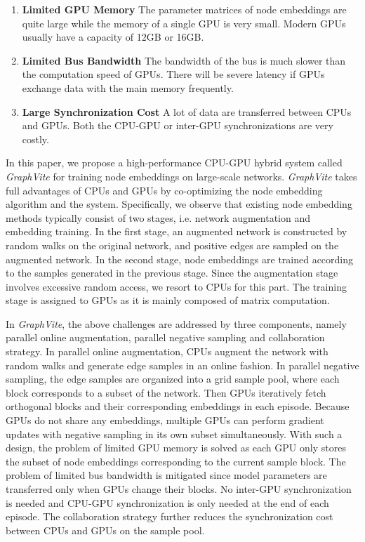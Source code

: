 \documentclass[sigconf]{acmart}
\newcommand{\Graphy}{\textit{GraphVite}\xspace}
\begin{document}
\begin{enumerate}[leftmargin=*]
    \item{\textbf{Limited GPU Memory} The parameter matrices of node embeddings are quite large while the memory of a single GPU is very small. Modern GPUs usually have a capacity of 12GB or 16GB. }
    \item{\textbf{Limited Bus Bandwidth} The bandwidth of the bus is much slower than the computation speed of GPUs. There will be severe latency if GPUs exchange data with the main memory frequently. }
    \item{\textbf{Large Synchronization Cost} A lot of data are transferred between CPUs and GPUs. Both the CPU-GPU or inter-GPU synchronizations are very costly.}
\end{enumerate}

In this paper, we propose a high-performance CPU-GPU hybrid system called \Graphy for training node embeddings on large-scale networks. \Graphy takes full advantages of CPUs and GPUs by co-optimizing the node embedding algorithm and the system. Specifically, we observe that existing node embedding methods typically consist of two stages, i.e. network augmentation and embedding training. In the first stage, an augmented network is constructed by random walks on the original network, and positive edges are sampled on the augmented network. In the second stage, node embeddings are trained according to the samples generated in the previous stage. Since the augmentation stage involves excessive random access, we resort to CPUs for this part. The training stage is assigned to GPUs as it is mainly composed of matrix computation.

In \Graphy, the above challenges are addressed by three components, namely parallel online augmentation, parallel negative sampling and collaboration strategy. In parallel online augmentation, CPUs augment the network with random walks and generate edge samples in an online fashion. In parallel negative sampling, the edge samples are organized into a grid sample pool, where each block corresponds to a subset of the network. Then GPUs iteratively fetch orthogonal blocks and their corresponding embeddings in each episode. Because GPUs do not share any embeddings, multiple GPUs can perform gradient updates with negative sampling in its own subset simultaneously. With such a design, the problem of limited GPU memory is solved as each GPU only stores the subset of node embeddings corresponding to the current sample block. The problem of limited bus bandwidth is mitigated since model parameters are transferred only when GPUs change their blocks. No inter-GPU synchronization is needed and CPU-GPU synchronization is only needed at the end of each episode. The collaboration strategy further reduces the synchronization cost between CPUs and GPUs on the sample pool.
\end{document}
